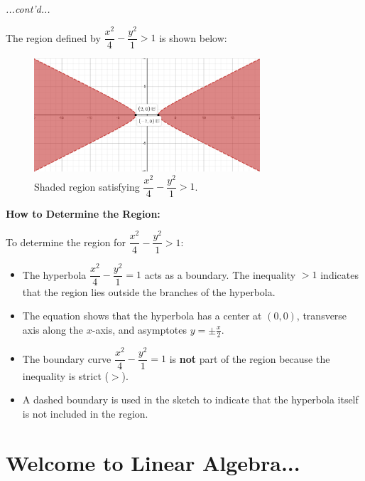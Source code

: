 \documentclass{article}
\begin{document}
\begin{examplebox}
\textit{...cont'd...}
\begin{solutionbox}
    The region defined by \( \dfrac{x^2}{4} - \dfrac{y^2}{1} > 1 \) is shown below:
    
    \begin{blankbox}
    \begin{figure}[H]
        \centering
        \includegraphics[width=0.75\textwidth]{x^2 over 4 + y^2 gt 1.png}
        \caption{Shaded region satisfying \( \dfrac{x^2}{4} - \dfrac{y^2}{1} > 1 \).}
        \label{fig:hyperbola_region}
    \end{figure}
    \end{blankbox}

    \textbf{How to Determine the Region:}
    \begin{conceptbox}
    To determine the region for \( \dfrac{x^2}{4} - \dfrac{y^2}{1} > 1 \):
    \begin{itemize}
        \item The hyperbola \( \dfrac{x^2}{4} - \dfrac{y^2}{1} = 1 \) acts as a boundary. The inequality \( > 1 \) indicates that the region lies outside the branches of the hyperbola.
        \item The equation shows that the hyperbola has a center at \( (0,0) \), transverse axis along the \( x \)-axis, and asymptotes \( y = \pm \frac{x}{2} \).
        \item The boundary curve \( \dfrac{x^2}{4} - \dfrac{y^2}{1} = 1 \) is \textbf{not} part of the region because the inequality is strict (\( > \)).
        \item A dashed boundary is used in the sketch to indicate that the hyperbola itself is not included in the region.
    \end{itemize}
    \end{conceptbox}
\end{solutionbox}    
\end{examplebox}

\section*{Welcome to Linear Algebra...}
\end{document}
